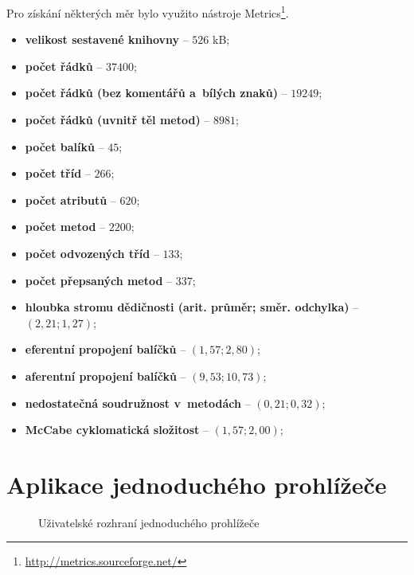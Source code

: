 Pro získání některých měr bylo využito nástroje Metrics\footnote{\url{http://metrics.sourceforge.net/}}.

\begin{itemize}
  \item \textbf{velikost sestavené knihovny} -- $526$ kB;
  \item \textbf{počet řádků} -- $37400$;
  \item \textbf{počet řádků (bez komentářů a~bílých znaků)} -- $19249$;
  \item \textbf{počet řádků (uvnitř těl metod)} -- $8981$;
  \item \textbf{počet balíků} -- $45$;
  \item \textbf{počet tříd} -- $266$;
  \item \textbf{počet atributů} -- $620$;
  \item \textbf{počet metod} -- $2200$;
  \item \textbf{počet odvozených tříd} -- $133$;
  \item \textbf{počet přepsaných metod} -- $337$;
  \item \textbf{hloubka stromu dědičnosti (arit. průměr; směr. odchylka)} -- $(2,21; 1,27)$;
  \item \textbf{eferentní propojení balíčků} -- $(1,57;2,80)$;
  \item \textbf{aferentní propojení balíčků} -- $(9,53;10,73)$;
  \item \textbf{nedostatečná soudružnost v~metodách} -- $(0,21;0,32)$;
  \item \textbf{McCabe cyklomatická složitost} -- $(1,57;2,00)$;
\end{itemize}

\chapter{Aplikace jednoduchého prohlížeče}
\label{Annex.SimpleBrowser}

\begin{figure}[H]
  \begin{center}
    \caption{Uživatelské rozhraní jednoduchého prohlížeče}
    \label{Figure.SimpleBrowserScreenshot}
  \end{center}
\end{figure}

